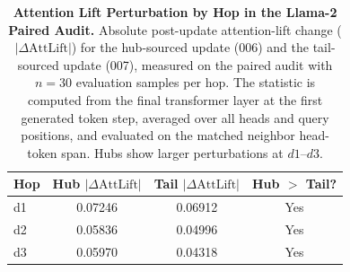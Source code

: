 \begin{table}[t]
\centering
\small
\begin{tabular}{lccc}
\toprule
\textbf{Hop} & \textbf{Hub $|\Delta \mathrm{AttLift}|$} & \textbf{Tail $|\Delta \mathrm{AttLift}|$} & \textbf{Hub $>$ Tail?} \\
\midrule
d1 & 0.07246 & 0.06912 & Yes \\
d2 & 0.05836 & 0.04996 & Yes \\
d3 & 0.05970 & 0.04318 & Yes \\
\bottomrule
\end{tabular}
\caption{\label{tab:attention_lift_by_hop} \textbf{Attention Lift Perturbation by Hop in the Llama-2 Paired Audit.} Absolute post-update attention-lift change ($|\Delta \mathrm{AttLift}|$) for the hub-sourced update (006) and the tail-sourced update (007), measured on the paired audit with $n=30$ evaluation samples per hop. The statistic is computed from the final transformer layer at the first generated token step, averaged over all heads and query positions, and evaluated on the matched neighbor head-token span. Hubs show larger perturbations at $d1$--$d3$.}
\end{table}
